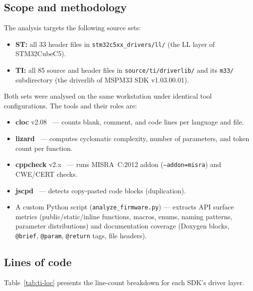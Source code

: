 \subsection{Scope and methodology}
\label{subsec:ti-scope}

The analysis targets the following source sets:

\begin{itemize}
  \item \textbf{ST:} all 33 header files in
        \texttt{stm32c5xx\_drivers/ll/} (the LL layer of STM32CubeC5).
  \item \textbf{TI:} all 85 source and header files in
        \texttt{source/ti/driverlib/} and its \texttt{m33/} subdirectory
        (the driverlib of MSPM33 SDK v1.03.00.01).
\end{itemize}

Both sets were analysed on the same workstation under identical tool configurations. The
tools and their roles are:

\begin{itemize}
  \item \textbf{cloc} v2.08~\cite{cloc-tool} --- counts blank, comment, and code lines per
        language and file.
  \item \textbf{lizard}~\cite{lizard-tool} --- computes cyclomatic complexity, number of
        parameters, and token count per function.
  \item \textbf{cppcheck} v2.x~\cite{cppcheck-tool} --- runs MISRA~C:2012 addon
        (\texttt{--addon=misra}) and CWE/CERT checks.
  \item \textbf{jscpd}~\cite{jscpd-tool} --- detects copy-pasted code blocks (duplication).
  \item A custom Python script (\texttt{analyze\_firmware.py}) --- extracts API surface
        metrics (public/static/inline functions, macros, enums, naming patterns, parameter
        distributions) and documentation coverage (Doxygen blocks, \texttt{@brief},
        \texttt{@param}, \texttt{@return} tags, file headers).
\end{itemize}

\subsection{Lines of code}
\label{subsec:ti-loc}

Table~\ref{tab:ti-loc} presents the line-count breakdown for each SDK's driver layer.

